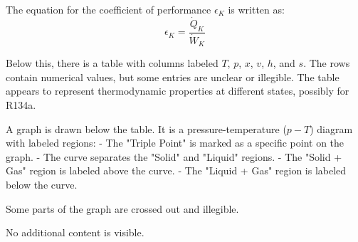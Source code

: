 The equation for the coefficient of performance \( \epsilon_K \) is written as:  
\[
\epsilon_K = \frac{\dot{Q}_K}{\dot{W}_K}
\]  

Below this, there is a table with columns labeled \( T \), \( p \), \( x \), \( v \), \( h \), and \( s \). The rows contain numerical values, but some entries are unclear or illegible. The table appears to represent thermodynamic properties at different states, possibly for R134a.  

A graph is drawn below the table. It is a pressure-temperature (\( p-T \)) diagram with labeled regions:  
- The "Triple Point" is marked as a specific point on the graph.  
- The curve separates the "Solid" and "Liquid" regions.  
- The "Solid + Gas" region is labeled above the curve.  
- The "Liquid + Gas" region is labeled below the curve.  

Some parts of the graph are crossed out and illegible.  

No additional content is visible.